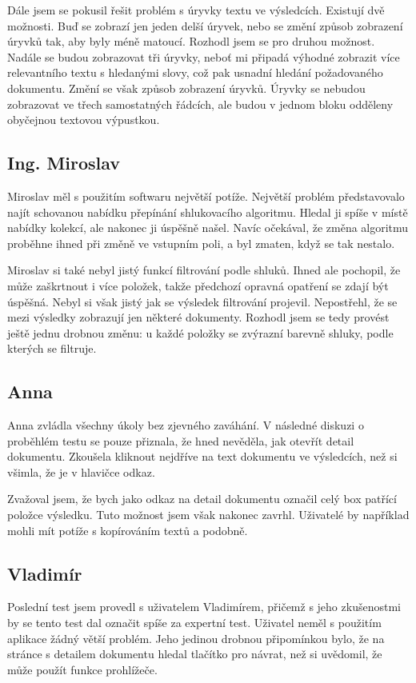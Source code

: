 Dále jsem se pokusil řešit problém s úryvky textu ve výsledcích. Existují dvě možnosti. Buď se zobrazí jen jeden delší úryvek, nebo se změní způsob zobrazení úryvků tak, aby byly méně matoucí. Rozhodl jsem se pro druhou možnost. Nadále se budou zobrazovat tři úryvky, neboť mi připadá výhodné zobrazit více relevantního textu s hledanými slovy, což pak usnadní hledání požadovaného dokumentu. Změní se však způsob zobrazení úryvků. Úryvky se nebudou zobrazovat ve třech samostatných řádcích, ale budou v jednom bloku odděleny obyčejnou textovou výpustkou.

\subsection{Ing. Miroslav}
Miroslav měl s použitím softwaru největší potíže. Největší problém představovalo najít schovanou nabídku přepínání shlukovacího algoritmu. Hledal ji spíše v místě nabídky kolekcí, ale nakonec ji úspěšně našel. Navíc očekával, že změna algoritmu proběhne ihned při změně ve vstupním poli, a byl zmaten, když se tak nestalo.

Miroslav si také nebyl jistý funkcí filtrování podle shluků. Ihned ale pochopil, že může zaškrtnout i více položek, takže předchozí opravná opatření se zdají být úspěšná. Nebyl si však jistý jak se výsledek filtrování projevil. Nepostřehl, že se mezi výsledky zobrazují jen některé dokumenty. Rozhodl jsem se tedy provést ještě jednu drobnou změnu: u každé položky se zvýrazní barevně shluky, podle kterých se filtruje.

\subsection{Anna}
Anna zvládla všechny úkoly bez zjevného zaváhání. V následné diskuzi o proběhlém testu se pouze přiznala, že hned nevěděla, jak otevřít detail dokumentu. Zkoušela kliknout nejdříve na text dokumentu ve výsledcích, než si všimla, že je v hlavičce odkaz.

Zvažoval jsem, že bych jako odkaz na detail dokumentu označil celý box patřící položce výsledku. Tuto možnost jsem však nakonec zavrhl. Uživatelé by například mohli mít potíže s kopírováním textů a podobně.

\subsection{Vladimír}
Poslední test jsem provedl s uživatelem Vladimírem, přičemž s jeho zkušenostmi by se tento test dal označit spíše za expertní test. Uživatel neměl s použitím aplikace žádný větší problém. Jeho jedinou drobnou připomínkou bylo, že na stránce s detailem dokumentu hledal tlačítko pro návrat, než si uvědomil, že může použít funkce prohlížeče.

